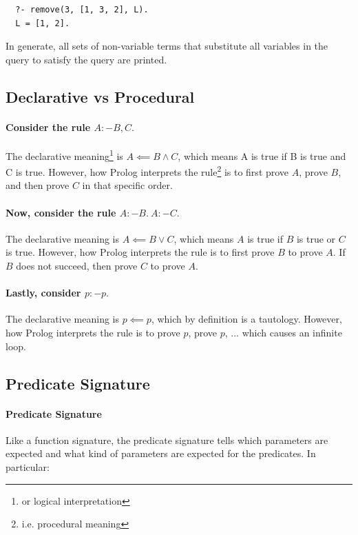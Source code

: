 \documentclass{article}
\begin{document}
\begin{multicols}{2}
  \begin{lstlisting}
  ?- remove(3, [1, 3, 2], L).
  L = [1, 2].
  \end{lstlisting}
  
  In generate, all sets of non-variable terms that substitute all variables in the query to satisfy the query are printed.
  
  \subsection{Declarative vs Procedural}
  
  \paragraph{Consider the rule $A :- B, C.$} The declarative meaning\footnote{or logical interpretation} is $A \impliedby B \land C$, which means A is true if B is true and C is true. However, how Prolog interprets the rule\footnote{i.e. procedural meaning} is to first prove $A$, prove $B$, and then prove $C$ in that specific order. 
  
  \paragraph{Now, consider the rule $A :- B.\ A :- C.$} The declarative meaning is $A \impliedby B \lor C$, which means $A$ is true if $B$ is true or $C$ is true. However, how Prolog interprets the rule is to first prove $B$ to prove $A$. If $B$ does not succeed, then prove $C$ to prove $A$. 
  
  \paragraph{Lastly, consider $p :- p.$} The declarative meaning is $p \impliedby p$, which by definition is a tautology. However, how Prolog interprets the rule is to prove $p$, prove $p$, ...  which causes an infinite loop.
  
  \subsection{Predicate Signature}
  
  \paragraph{Predicate Signature} Like a function signature, the predicate signature tells which parameters are expected and what kind of parameters are expected for the predicates. In particular:
  

\end{multicols}
\end{document}
